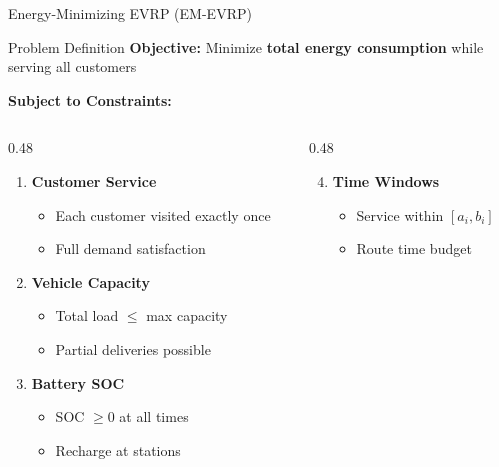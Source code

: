 \documentclass[aspectratio=169,11pt]{beamer}
\begin{document}
\begin{frame}{Energy-Minimizing EVRP (EM-EVRP)}
    \begin{block}{Problem Definition}
        \textbf{Objective:} Minimize \textbf{total energy consumption} while serving all customers
    \end{block}
    
    \vspace{0.3cm}
    \textbf{Subject to Constraints:}
    
    \begin{columns}[T]
        \begin{column}{0.48\textwidth}
            \begin{enumerate}
                \item \textbf{Customer Service}
                \begin{itemize}
                    \item Each customer visited exactly once
                    \item Full demand satisfaction
                \end{itemize}
                
                \item \textbf{Vehicle Capacity}
                \begin{itemize}
                    \item Total load $\leq$ max capacity
                    \item Partial deliveries possible
                \end{itemize}
                
                \item \textbf{Battery SOC}
                \begin{itemize}
                    \item SOC $\geq 0$ at all times
                    \item Recharge at stations
                \end{itemize}
            \end{enumerate}
        \end{column}
        \begin{column}{0.48\textwidth}
            \begin{enumerate}
                \setcounter{enumi}{3}
                \item \textbf{Time Windows}
                \begin{itemize}
                    \item Service within $[a_i, b_i]$
                    \item Route time budget
                \end{itemize}
                

\end{enumerate}
\end{column}
\end{columns}
\end{frame}
\end{document}

